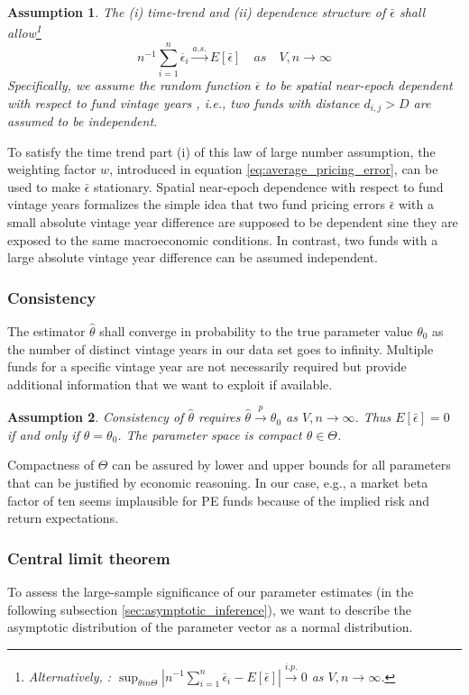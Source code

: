 \documentclass[12pt]{article}
\newtheorem{assume}{Assumption}
\begin{document}
\begin{assume}
	\label{as:lln}
	The (i) time-trend and (ii) dependence structure of $\bar{\epsilon}$ shall allow\footnote{Alternatively, \cite[equation 6]{JP09}: $\sup_{\theta in \Theta} \left| n^{-1} \sum_{i=1}^n \overline{\epsilon}_i -  E[\bar{\epsilon}]
		\right| \overset{i.p.}\to 0$ as $V,n \to \infty$.}
	\[
	n^{-1} \sum_{i=1}^n \overline{\epsilon}_i \overset{a.s.}\to E[\bar{\epsilon}]
	\quad {as} \quad V,n \to \infty
	\]
	Specifically, we assume the random function $\overline{\epsilon}$ to be spatial near-epoch dependent with respect to fund vintage years \citep{JP09,JP12}, i.e., two funds with distance $d_{i,j}>D$ are assumed to be independent.
\end{assume}
To satisfy the time trend part (i) of this law of large number assumption, the weighting factor $w$, introduced in equation \ref{eq:average_pricing_error}, can be used to make $\bar{\epsilon}$ stationary.
Spatial near-epoch dependence with respect to fund vintage years formalizes the simple idea that two fund pricing errors $\bar{\epsilon}$ with a small absolute vintage year difference are supposed to be dependent sine they are exposed to the same macroeconomic conditions.
In contrast, two funds with a large absolute vintage year difference can be assumed independent.

\subsubsection{Consistency}
The estimator $\hat{\theta}$ shall converge in probability to the true parameter value $\theta_0$ as the number of distinct vintage years in our data set goes to infinity.
Multiple funds for a specific vintage year are not necessarily required but provide additional information that we want to exploit if available.

\begin{assume}
\label{as:consistency}
 Consistency of $\hat{\theta}$ requires $\hat{\theta} \overset{p}{\to} \theta_0$ as $V,n \to \infty$.
 Thus $E[\bar{\epsilon}]=0$ if and only if $\theta=\theta_0$.
 The parameter space is compact $\theta \in \Theta$.
\end{assume}
Compactness of $\Theta$ can be assured by lower and upper bounds for all parameters that can be justified by economic reasoning. In our case, e.g., a market beta factor of ten seems implausible for PE funds because of the implied risk and return expectations.

\subsubsection{Central limit theorem}
To assess the large-sample significance of our parameter estimates (in the following subsection \ref{sec:asymptotic_inference}), we want to describe the asymptotic distribution of the parameter vector as a normal distribution.
\end{document}
